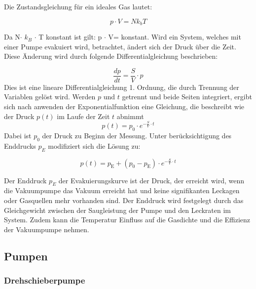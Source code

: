 Die Zustandsgleichung für ein ideales Gas lautet:

\begin{equation}
    p \cdot V=Nk_bT 
\end{equation}

Da N$\cdot$ $k_B$ $\cdot$ T konstant ist gilt:  p $\cdot$ V= konstant.
Wird ein System, welches mit einer Pumpe evakuiert wird, betrachtet, ändert sich der Druck über die Zeit.
Diese Änderung wird durch folgende Differentialgleichung beschrieben:

\begin{equation}
    \frac{dp}{dt}=\frac{S}{V}\cdot p
\end{equation}
Dies ist eine lineare Differentialgleichung 1. Ordnung, die durch Trennung der Variablen gelöst wird.
Werden \(p \) und \(t \) getrennt und beide Seiten integriert, ergibt sich nach anwenden der Exponentialfunktion eine
Gleichung, die beschreibt wie der Druck \(p(t)\) im Laufe der Zeit \(t \) abnimmt
\begin{equation}
p(t)=p_0\cdot e^{-\frac{S}{V}\cdot t}
\end{equation}
Dabei ist \(p_0\) der Druck zu Beginn der Messung. Unter berücksichtigung des Enddrucks \(p_E\) modifiziert sich die Lösung zu: 
\cite{grundlagen_vakuumtechnik}

\begin{equation}
    p(t)=p_{\text{E}}+(p_0-p_{\text{E}})\cdot e^{-\frac{S}{V}\cdot t}
    \label{eq:druckkurve}
\end{equation}

Der Enddruck \(p_E\) der Evakuierungskurve ist der Druck, der erreicht wird, wenn die Vakuumpumpe das Vakuum erreicht hat und 
keine signifikanten Leckagen oder Gasquellen mehr vorhanden sind. Der Enddruck wird festgelegt durch das Gleichgewicht zwischen
der Saugleistung der Pumpe und den Leckraten im System. Zudem kann die Temperatur Einfluss auf die Gasdichte und die Effizienz 
der Vakuumpumpe nehmen.



\subsection{Pumpen}
\subsubsection{Drehschieberpumpe}


